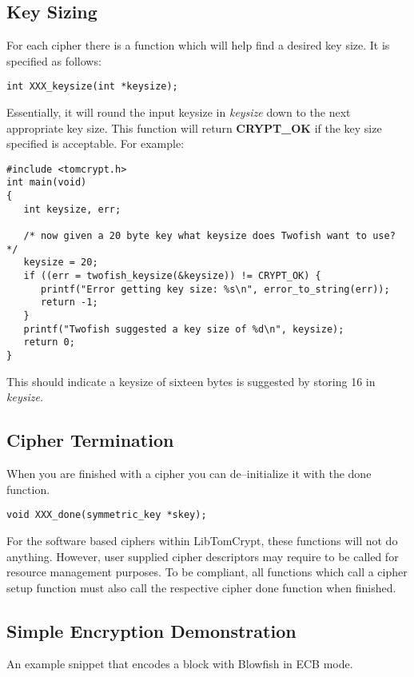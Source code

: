\documentclass[synpaper]{book}
\begin{document}
\subsection{Key Sizing}
For each cipher there is a function which will help find a desired key size.  It is specified as follows:
\begin{verbatim}
int XXX_keysize(int *keysize);
\end{verbatim}
Essentially, it will round the input keysize in \textit{keysize} down to the next appropriate key size.  This function
will return {\bf CRYPT\_OK} if the key size specified is acceptable.  For example:
\begin{small}
\begin{verbatim}
#include <tomcrypt.h>
int main(void)
{
   int keysize, err;

   /* now given a 20 byte key what keysize does Twofish want to use? */
   keysize = 20;
   if ((err = twofish_keysize(&keysize)) != CRYPT_OK) {
      printf("Error getting key size: %s\n", error_to_string(err));
      return -1;
   }
   printf("Twofish suggested a key size of %d\n", keysize);
   return 0;
}
\end{verbatim}
\end{small}
This should indicate a keysize of sixteen bytes is suggested by storing 16 in \textit{keysize.}

\subsection{Cipher Termination}
When you are finished with a cipher you can de--initialize it with the done function.
\begin{verbatim}
void XXX_done(symmetric_key *skey);
\end{verbatim}
For the software based ciphers within LibTomCrypt, these functions will not do anything.  However, user supplied
cipher descriptors may require to be called for resource management purposes.  To be compliant, all functions which call a cipher
setup function must also call the respective cipher done function when finished.

\subsection{Simple Encryption Demonstration}
An example snippet that encodes a block with Blowfish in ECB mode.
\end{document}
